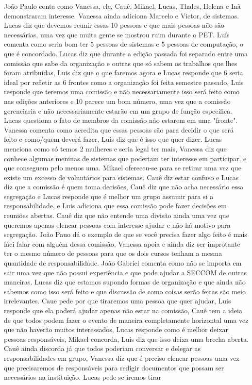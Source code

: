 \documentclass{ata-calico}
\begin{document}
\maketitle

João Paulo conta como Vanessa, ele, Cauê, Mikael, Lucas, Thales, Helena e Inã demonstraram interesse. Vanessa ainda adiciona Marcelo e Victor, de sistemas. Lucas diz que devemos reunir essas 10 pessoas e que mais pessoas não são necessárias, uma vez que muita gente se mostrou ruim durante o PET. Luís comenta como seria bom ter 5 pessoas de sistemas e 5 pessoas de computação, o que é concordado. Lucas diz que durante a edição passada foi separado entre uma comissão que sabe da organização e outras que só sabem os trabalhos que lhes foram atribuídas, Luis diz que o que faremos agora e Lucas responde que 6 seria ideal por refletir as 6 frontes como a organização foi feita semestre passado, Luis responde que teremos uma comissão e não necessariamente isso será feito como nas edições anteriores e 10 parece um bom número, uma vez que a comissão gerenciaria e não necessariamente estarão em um grupo de função específica. Lucas questiona o fato de membros da comissão não estarem em uma "fronte". Vanessa comenta como acredita que essas pessoas são para decidir o que será feito e como/quem deverá fazer, Luis diz que é isso que quer dizer. Lucas menciona como só temos 2 mulheres e seria legal ter mais, Vanessa diz que conhece algumas meninas de sistemas que poderiam ter interesse em participar, e que conseguem pelo menos uma. Mikael ofereceu-se para se retirar uma vez que existe um excesso de voluntários para sistemas. Cauê diz estar confuso e Lucas diz que a comissão é quem toma decisões, Cauê diz que não acha necessário essa segregação e Lucas responde que é melhor um grupo assumir para si a responsabilidade, e Luis adiciona que essa comissão pode fazer decisões em reuniões abertas. Cauê diz que não entende uma divisão ainda uma vez que queremos apenas elencar pessoas com interesse ajudar e não há motivo para segregação. João Pauo dá o exemplo de que se você precisa fazer algo feito é mais fáci falar com alguém dessa comissão, Vanessa apoia e ainda diz ser improtante ter o mesmo número de pessoas para que os dois cursos tenham a mesma quantidade de responsabilidade. João Gabriel comenta como não se importa em sair uma vez que não possui experiência e que pode ajudar a SECCOM de outras maneiras. Lucas diz que estamos supondo formas de organização e que ainda não sabemos como isso será feito e que discussão de como coisas serão feitas são meio irrelevantes. Caue pede por que tiraremos uma pessoa que quer ajudar, Luis responde que ela poderá ajudar apenas não estar na comissão, Cauê tem a ideia de que todos podem fazer o evento de maneira completamente horizontal uma vez que não haverão muitos interessados, Lucas responde como é melhor deixar pessoas responsáveis, Mikael concorda, Luis diz que isso deixa uma brecha aberta. Cauê ainda discorda já que todos poderiam conversar e delegar as responsabilidades em grupo, Vanessa diz que é preciso elencar pessoas uma vez que precisaremos de responsáveis para redigir documentos que possam ser necessários na instituição. Lucas pede se iremos tirar 
\end{document}
